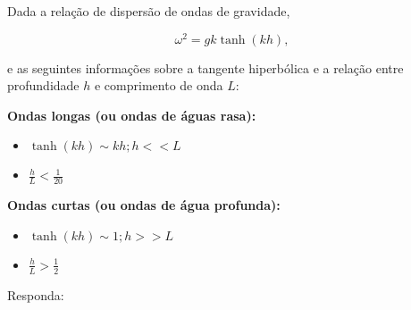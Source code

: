 

\question
Dada a relação de dispersão de ondas de gravidade,

\[
  \omega^2 = gk\tanh(kh),
\]


e as seguintes informações sobre a tangente hiperbólica e a relação entre
profundidade $h$ e comprimento de onda $L$:

{\bf Ondas longas (ou ondas de águas rasa):}
\begin{itemize}
  \item $\tanh(kh) \sim kh; h << L$
  \item $\frac{h}{L} < \frac{1}{20}$
\end{itemize}

{\bf Ondas curtas (ou ondas de água profunda):}
\begin{itemize}
  \item $\tanh(kh) \sim 1; h >> L$
  \item $\frac{h}{L} > \frac{1}{2}$
\end{itemize}

Responda:

